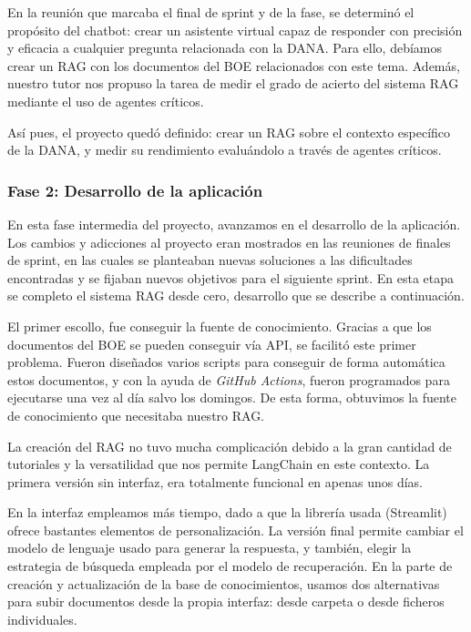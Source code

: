         		\noindent En la reunión que marcaba el final de sprint y de la fase, se determinó el propósito del chatbot: crear un asistente virtual capaz de responder con precisión y eficacia a cualquier pregunta relacionada con la DANA. Para ello, debíamos crear un RAG con los documentos del BOE relacionados con este tema. Además, nuestro tutor nos propuso la tarea de medir el grado de acierto del sistema RAG mediante el uso de agentes críticos. 
        		
        		\noindent Así pues, el proyecto quedó definido: crear un RAG sobre el contexto específico de la DANA, y medir su rendimiento evaluándolo a través de agentes críticos.
        		
        	\subsubsection{Fase 2: Desarrollo de la aplicación}
        	
        		En esta fase intermedia del proyecto, avanzamos en el desarrollo de la aplicación. Los cambios y adicciones al proyecto eran mostrados en las reuniones de finales de sprint, en las cuales se planteaban nuevas soluciones a las dificultades encontradas y se fijaban nuevos objetivos para el siguiente sprint. En esta etapa se completo el sistema RAG desde cero, desarrollo que se describe a continuación.
        		
        		\noindent El primer escollo, fue conseguir la fuente de conocimiento. Gracias a que los documentos del BOE se pueden conseguir vía API, se facilitó este primer problema. Fueron diseñados varios scripts para conseguir de forma automática estos documentos, y con la ayuda de \textit{GitHub Actions}, fueron programados para ejecutarse una vez al día salvo los domingos. De esta forma, obtuvimos la fuente de conocimiento que necesitaba nuestro RAG.
        		
        		\noindent La creación del RAG no tuvo mucha complicación debido a la gran cantidad de tutoriales y la versatilidad que nos permite LangChain en este contexto. La primera versión sin interfaz, era totalmente funcional en apenas unos días.
        		
        		\noindent En la interfaz empleamos más tiempo, dado a que la librería usada (Streamlit) ofrece bastantes elementos de personalización. La versión final permite cambiar el modelo de lenguaje usado para generar la respuesta, y también, elegir la estrategia de búsqueda empleada por el modelo de recuperación. En la parte de creación y actualización de la base de conocimientos, usamos dos alternativas para subir documentos desde la propia interfaz: desde carpeta o desde ficheros individuales.
        		

